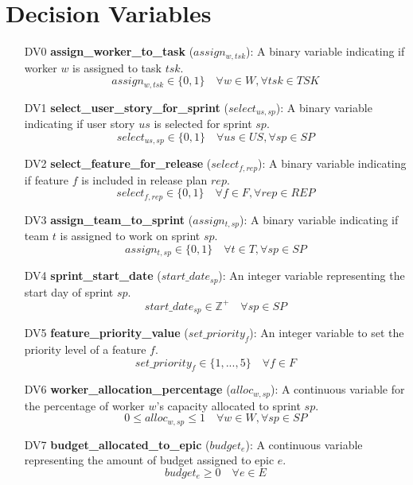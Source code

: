 \documentclass[11pt]{article}
\begin{document}
\section{Decision Variables}
\label{sec:decisionvariables}
\begin{itemize}
    \item[DV0] \textbf{assign\_worker\_to\_task} ($assign_{w,tsk}$): A binary variable indicating if worker $w$ is assigned to task $tsk$.
    $$ assign_{w,tsk} \in \{0,1\} \quad \forall w \in W, \forall tsk \in TSK $$
    \item[DV1] \textbf{select\_user\_story\_for\_sprint} ($select_{us,sp}$): A binary variable indicating if user story $us$ is selected for sprint $sp$.
    $$ select_{us,sp} \in \{0,1\} \quad \forall us \in US, \forall sp \in SP $$
    \item[DV2] \textbf{select\_feature\_for\_release} ($select_{f,rep}$): A binary variable indicating if feature $f$ is included in release plan $rep$.
    $$ select_{f,rep} \in \{0,1\} \quad \forall f \in F, \forall rep \in REP $$
    \item[DV3] \textbf{assign\_team\_to\_sprint} ($assign_{t,sp}$): A binary variable indicating if team $t$ is assigned to work on sprint $sp$.
    $$ assign_{t,sp} \in \{0,1\} \quad \forall t \in T, \forall sp \in SP $$
    \item[DV4] \textbf{sprint\_start\_date} ($start\_date_{sp}$): An integer variable representing the start day of sprint $sp$.
    $$ start\_date_{sp} \in \mathbb{Z}^+ \quad \forall sp \in SP $$
    \item[DV5] \textbf{feature\_priority\_value} ($set\_priority_{f}$): An integer variable to set the priority level of a feature $f$.
    $$ set\_priority_{f} \in \{1, ..., 5\} \quad \forall f \in F $$
    \item[DV6] \textbf{worker\_allocation\_percentage} ($alloc_{w,sp}$): A continuous variable for the percentage of worker $w$'s capacity allocated to sprint $sp$.
    $$ 0 \le alloc_{w,sp} \le 1 \quad \forall w \in W, \forall sp \in SP $$
    \item[DV7] \textbf{budget\_allocated\_to\_epic} ($budget_{e}$): A continuous variable representing the amount of budget assigned to epic $e$.
    $$ budget_{e} \ge 0 \quad \forall e \in E $$
\end{itemize}
\end{document}
